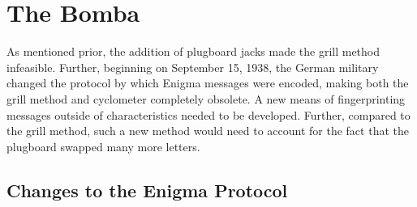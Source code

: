 \section{The Bomba}

As mentioned prior, the addition of plugboard jacks made the grill
method infeasible.
Further, beginning on September 15, 1938, the German military changed
the protocol by which Enigma messages were encoded, making both the grill
method and cyclometer completely obsolete. A new means of fingerprinting messages
outside of characteristics needed to be developed. Further, compared
to the grill method, such a new method would need to account for the
fact that the plugboard swapped many more letters.

\subsection{Changes to the Enigma Protocol}

